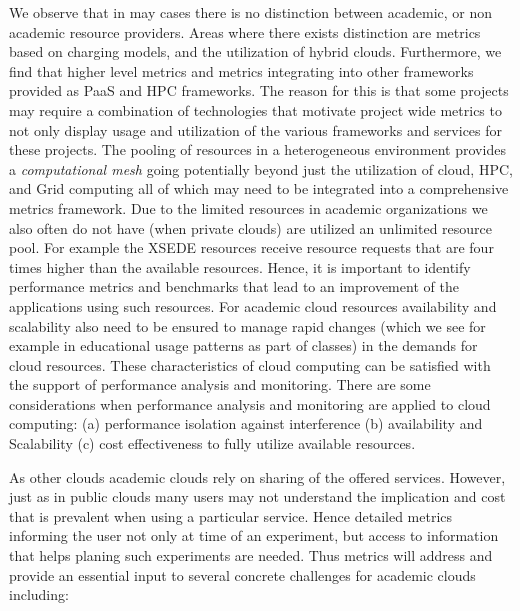 \documentclass{sig-alternate-05-2015}
\begin{document}
We observe that in may cases there is no distinction between academic,
or non academic resource providers. Areas where there exists
distinction are metrics based on charging models, and the utilization
of hybrid clouds. Furthermore, we find that higher level metrics and
metrics integrating into other frameworks provided as PaaS and HPC
frameworks. The reason for this is that some projects may require a
combination of technologies that motivate project wide metrics to not
only display usage and utilization of the various frameworks and
services for these projects. The pooling of resources in a
heterogeneous environment provides a {\it computational mesh} going
potentially beyond just the utilization of cloud, HPC, and Grid
computing all of which may need to be integrated into a comprehensive
metrics framework. Due to the limited resources in academic
organizations we also often do not have (when private clouds) are
utilized an unlimited resource pool. For example the XSEDE resources
receive resource requests that are four times higher than the
available resources. Hence, it is important to identify performance
metrics and benchmarks that lead to an improvement of the applications
using such resources. For academic cloud resources availability and
scalability also need to be ensured to manage rapid changes (which we
see for example in educational usage patterns as part of classes) in the
demands for cloud resources. These characteristics of cloud computing
can be satisfied with the support of performance analysis and
monitoring. There are some considerations when performance analysis
and monitoring are applied to cloud computing: (a) performance
isolation against interference (b) availability and Scalability (c)
cost effectiveness to fully utilize available resources.


As other clouds academic clouds rely on sharing of the offered
services. However, just as in public clouds many users may not
understand the implication and cost that is prevalent when using a
particular service. Hence detailed metrics informing the user not only
at time of an experiment, but access to information that helps planing
such experiments are needed. Thus metrics will address and provide an
essential input to several concrete challenges for academic clouds
including:
\end{document}
